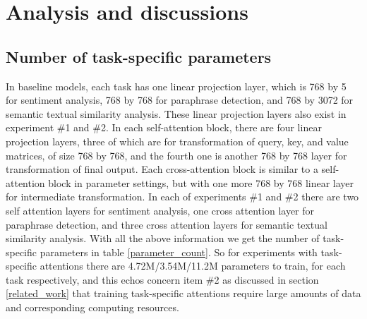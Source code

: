 \documentclass{article}
\begin{document}

\section{Analysis and discussions}
\label{analysis}



\subsection{Number of task-specific parameters}
\label{task_specific_size}

In baseline models, each task has one linear projection layer, which is 768 by 5 for sentiment analysis, 768 by 768 for paraphrase detection, and 768 by 3072 for semantic textual similarity analysis. These linear projection layers also exist in experiment \#1 and \#2. In each self-attention block, there are four linear projection layers, three of which are for transformation of query, key, and value matrices, of size 768 by 768, and the fourth one is another 768 by 768 layer for transformation of final output. Each cross-attention block is similar to a self-attention block in parameter settings, but with one more 768 by 768 linear layer for intermediate transformation. In each of experiments \#1 and \#2 there are two self attention layers for sentiment analysis, one cross attention layer for paraphrase detection, and three cross attention layers for semantic textual similarity analysis. With all the above information we get the number of task-specific parameters in table \ref{parameter_count}. So for experiments with task-specific attentions there are 4.72M/3.54M/11.2M parameters to train, for each task respectively, and this echos concern item \#2 as discussed in section \ref{related_work} that training task-specific attentions require large amounts of data and corresponding computing resources. 
\end{document}

